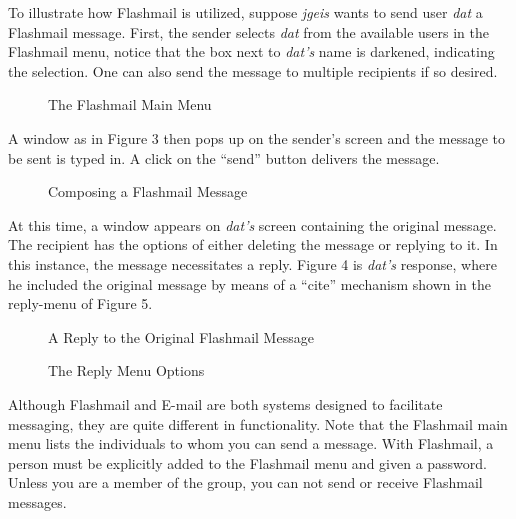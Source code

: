 To illustrate how Flashmail is utilized, suppose \textit{jgeis} wants to send user
\textit{dat} a Flashmail message.  First, the sender selects \textit{dat} from the
available users in the Flashmail menu, notice that the box next to \textit{dat's}
name is darkened, indicating the selection.  One can also send the message
to multiple recipients if so desired.

\begin{figure}[htb]



  {\centerline{}}
  \caption{The Flashmail Main Menu}
  \label{Main-menu}
\end{figure}


A window as in Figure 3 then pops up on the sender's screen and the
message to be sent is typed in. A click on the ``send'' button delivers the
message.

\begin{figure}[htb]



  {\centerline{}}
  \caption{Composing a Flashmail Message}
  \label{Compose}
\end{figure}

At this time, a window appears on \textit{dat's} screen containing the original
message.  The recipient has the options of either deleting the message or
replying to it.  In this instance, the message necessitates a reply.
Figure 4 is \textit{dat's} response, where he included the original message by
means of a ``cite'' mechanism shown in the reply-menu of Figure 5.

\begin{figure}[htb]



  {\centerline{}}
  \caption{A Reply to the Original Flashmail Message}
  \label{Reply}
\end{figure}


\begin{figure}[htb]



  {\centerline{}}
  \caption{The Reply Menu Options}
  \label{Reply-menu}
\end{figure}

Although Flashmail and E-mail are both systems designed to facilitate
messaging, they are quite different in functionality.  Note that the
Flashmail main menu lists the individuals to whom you can send a message.
With Flashmail, a person must be explicitly added to the Flashmail menu and
given a password. Unless you are a member of the group, you can not send or
receive Flashmail messages.

